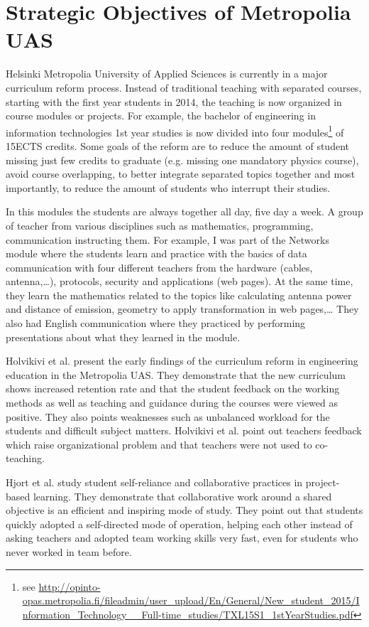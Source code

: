 \section{Strategic Objectives of Metropolia UAS}

Helsinki Metropolia University of Applied Sciences is currently in a major curriculum reform process. 
Instead of traditional teaching with separated courses, starting with the first year students in 2014, the teaching is now organized in course modules or projects. 
For example, the bachelor of engineering in information technologies 1st year studies is now divided into four modules\footnote{see \url{http://opinto-opas.metropolia.fi/fileadmin/user_upload/En/General/New_student_2015/Information_Technology__Full-time_studies/TXL15S1_1stYearStudies.pdf}} of 15ECTS credits. 
Some goals of the reform are to reduce the amount of student missing just few credits to graduate (e.g. missing one mandatory physics course), avoid course overlapping, to better integrate separated topics together and most importantly, to reduce the amount of students who interrupt their studies.

In this modules the students are always together all day, five day a week. A group of teacher from various disciplines such as mathematics, programming, communication instructing them. 
For example, I was part of the Networks module where the students learn and practice with the basics of data communication with four different teachers from the hardware (cables, antenna,\ldots), protocols, security and applications (web pages). 
At the same time, they learn the mathematics related to the topics like calculating antenna power and distance of emission, geometry to apply transformation in web pages,\ldots 
They also had English communication where they practiced by performing presentations about what they learned in the module.

Holvikivi et al. \cite{holvikivi_2015} present the early findings of the curriculum reform in engineering education in the Metropolia UAS. 
They demonstrate that the new curriculum shows increased retention rate and that the student feedback on the working methods as well as teaching and guidance during the courses were viewed as positive. They also points weaknesses such as unbalanced workload for the students and difficult subject matters. Holvikivi et al. point out teachers feedback which raise organizational problem and that teachers were not used to co-teaching.

Hjort et al. \cite{hjort_2015} study student self-reliance and collaborative practices in project-based learning. 
They demonstrate that collaborative work around a shared objective is an efficient and inspiring mode of study.
They point out that students quickly adopted a self-directed mode of operation, helping each other instead of asking teachers and adopted team working skills very fast, even for students who never worked in team before.


